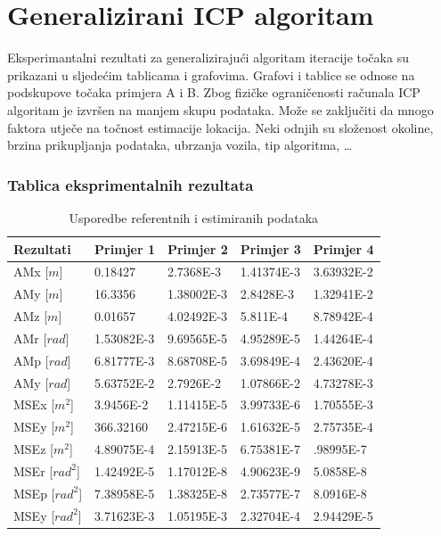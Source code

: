 \section{Generalizirani ICP algoritam}
Eksperimantalni rezultati za generalizirajući algoritam iteracije točaka su prikazani u sljedećim tablicama i grafovima. Grafovi i tablice se odnose na podskupove točaka primjera A i B. Zbog fizičke ograničenosti računala ICP algoritam je izvršen na manjem skupu podataka. Može se zaključiti da mnogo faktora utječe na točnost estimacije lokacija. Neki odnjih su složenost okoline, brzina prikupljanja podataka, ubrzanja vozila, tip algoritma, \dots

\subsubsection{Tablica eksprimentalnih rezultata}
\begin{table}[H]
  \begin{tabular}{ |p{3cm}| |p{2cm}|p{2cm}|p{2cm}|p{2cm}| }
    \hline
    Rezultati& Primjer 1& Primjer 2&Primjer 3& Primjer 4\\
    \hline
    AMx [$m$]& 0.18427& 2.7368E-3& 1.41374E-3& 3.63932E-2\\
    AMy [$m$]&  16.3356& 1.38002E-3& 2.8428E-3& 1.32941E-2\\
    AMz [$m$]& 0.01657& 4.02492E-3& 5.811E-4& 8.78942E-4\\
    AMr [$rad$]& 1.53082E-3& 9.69565E-5& 4.95289E-5& 1.44264E-4\\
    AMp [$rad$]& 6.81777E-3& 8.68708E-5& 3.69849E-4& 2.43620E-4\\
    AMy [$rad$]& 5.63752E-2& 2.7926E-2& 1.07866E-2& 4.73278E-3\\
    \hline
    MSEx [$m^2$]& 3.9456E-2& 1.11415E-5& 3.99733E-6& 1.70555E-3\\
    MSEy [$m^2$]& 366.32160& 2.47215E-6& 1.61632E-5& 2.75735E-4\\
    MSEz [$m^2$]& 4.89075E-4& 2.15913E-5& 6.75381E-7& .98995E-7\\
    MSEr [$rad^2$]& 1.42492E-5& 1.17012E-8& 4.90623E-9& 5.0858E-8\\
    MSEp [$rad^2$]& 7.38958E-5& 1.38325E-8& 2.73577E-7& 8.0916E-8\\
    MSEy [$rad^2$]& 3.71623E-3& 1.05195E-3& 2.32704E-4& 2.94429E-5\\
    \hline
  \end{tabular}
  \caption{Usporedbe referentnih i estimiranih podataka}
  \label{res:ref_est_table}
\end{table}
\pagebreak
